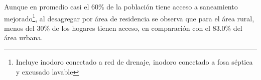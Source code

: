 Aunque en promedio casi el 60\% de la población tiene acceso a saneamiento mejorado\footnote{Incluye inodoro conectado a red de drenaje, inodoro conectado a fosa séptica y excusado lavable}, al desagregar por área de residencia se observa que para el área rural, menos del 30\% de los hogares tienen acceso, en comparación con el 83.0\% del área urbana.